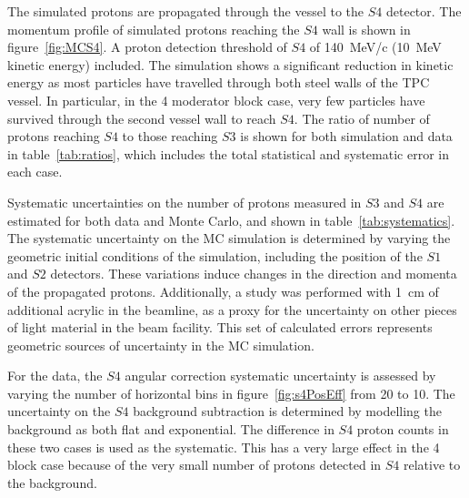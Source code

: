 The simulated protons are propagated through the vessel to the $\mathit{S4}$ detector.
The momentum profile of simulated protons reaching the $\mathit{S4}$ wall is shown in figure~\ref{fig:MCS4}.
A proton detection threshold of $\mathit{S4}$ of 140~MeV/c (10~MeV kinetic energy) included.
The simulation shows a significant reduction in kinetic energy as most particles have travelled through both steel walls of the TPC vessel.
In particular, in the 4 moderator block case, very few particles have survived through the second vessel wall to reach $\mathit{S4}$.
The ratio of number of protons reaching $\mathit{S4}$ to those reaching $\mathit{S3}$ is shown for both simulation and data in table~\ref{tab:ratios}, which includes the total statistical and systematic error in each case.

Systematic uncertainties on the number of protons measured in $\mathit{S3}$ and $\mathit{S4}$ are estimated for both data and Monte Carlo, and shown in table~\ref{tab:systematics}.
The systematic uncertainty on the MC simulation is determined by varying the geometric initial conditions of the simulation, including the position of the $\mathit{S1}$ and $\mathit{S2}$ detectors.
These variations induce changes in the direction and momenta of the propagated protons.
Additionally, a study was performed with 1~cm of additional acrylic in the beamline, as a proxy for the uncertainty on other pieces of light material in the beam facility.
This set of calculated errors represents geometric sources of uncertainty in the MC simulation.

For the data, the $\mathit{S4}$ angular correction systematic uncertainty is assessed by varying the number of horizontal bins in figure~\ref{fig:s4PosEff} from 20 to 10.
The uncertainty on the $\mathit{S4}$ background subtraction is determined by modelling the background as both flat and exponential. The difference in $\mathit{S4}$ proton counts in these two cases is used as the systematic.
This has a very large effect in the 4 block case because of the very small number of protons detected in $\mathit{S4}$ relative to the background.

